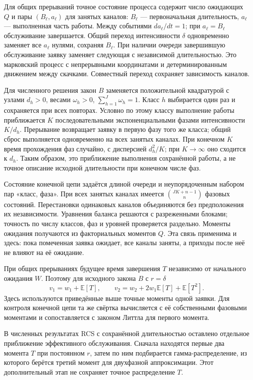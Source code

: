 Для общих прерываний точное состояние процесса содержит число ожидающих \(Q\) и пары \((B_\ell,a_\ell)\) для занятых каналов: \(B_\ell\) --- первоначальная длительность, \(a_\ell\) --- выполненная часть работы. Между событиями \(da_\ell/dt=1\); при \(a_\ell=B_\ell\) обслуживание завершается. Общий переход интенсивности \(\delta\) одновременно заменяет все \(a_\ell\) нулями, сохраняя \(B_\ell\). При наличии очереди завершившую обслуживание заявку заменяет следующая с независимой длительностью. Это марковский процесс с непрерывными координатами и детерминированным движением между скачками. Совместный переход сохраняет зависимость каналов.

Для численного решения закон \(B\) заменяется положительной квадратурой с узлами \(d_h>0\), весами \(\omega_h>0\), \(\sum_{h=1}^J\omega_h=1\). Класс \(h\) выбирается один раз и сохраняется при всех повторах. Условно по этому классу выполнение работы приближается \(K\) последовательными экспоненциальными фазами интенсивности \(K/d_h\). Прерывание возвращает заявку в первую фазу того же класса; общий сброс выполняется одновременно на всех занятых каналах. При конечном \(K\) время прохождения фаз случайно, с дисперсией \(d_h^2/K\); при \(K\to\infty\) оно сходится к \(d_h\). Таким образом, это приближение выполнения сохранённой работы, а не точное описание исходной длительности при конечном числе фаз.

Состояние конечной цепи задаётся длиной очереди и неупорядоченным набором пар «класс, фаза». При всех занятых каналах имеется \(\binom{JK+n-1}{n}\) фазовых состояний. Перестановки одинаковых каналов объединяются без предположения их независимости. Уравнения баланса решаются с разреженными блоками; точность по числу классов, фаз и уровней проверяется раздельно. Моменты ожидания получаются из факториальных моментов \(Q\). Эта связь применима и здесь: пока помеченная заявка ожидает, все каналы заняты, а приходы после неё не влияют на её ожидание.

При общих прерываниях будущее время завершения \(T\) независимо от начального ожидания \(W\). Поэтому для исходного закона \(B\) с \(r=\delta\)
\[
v_1=w_1+\mathbb E[T],\qquad
v_2=w_2+2w_1\mathbb E[T]+\mathbb E[T^2].
\]
Здесь используются приведённые выше точные моменты одной заявки. Для контроля конечной цепи та же свёртка вычисляется с её собственными фазовыми моментами и сопоставляется с законом Литтла для первого момента.

В численных результатах RCS с сохранённой длительностью оставлено отдельное приближение эффективного обслуживания. Сначала находятся первые два момента \(T\) при постоянном \(r\), затем по ним подбирается гамма-распределение, из которого берётся третий момент для двухфазной аппроксимации. Этот дополнительный этап не сохраняет точное распределение \(T\).

